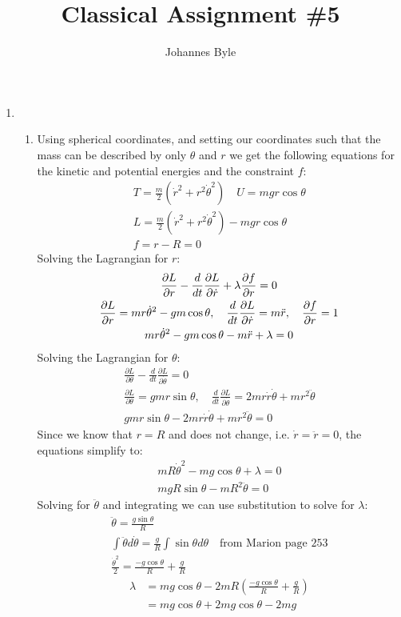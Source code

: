 \documentclass[12pt]{article}
\title{Classical Assignment \#5}
\author{Johannes Byle}
\newcommand{\p}[2]{\frac{\partial #1}{\partial #2}}
\newcommand{\der}[2]{\frac{d #1}{d #2}}
\newcommand{\Lag}[3]{
  \p{L}{#1}-\der{}{t}\p{L}{\dot{#1}}=0\\
  \p{L}{#1}=#2,\quad \der{}{t}\p{L}{\dot{#1}}=#3\\
  #2-#3=0
}
\newcommand{\Lagq}[4]{
  \p{L}{#1}-\der{}{t}\p{L}{\dot{#1}}+\lambda\p{f}{r}=0\\
  \p{L}{#1}=#2,\quad \der{}{t}\p{L}{\dot{#1}}=#3,\quad \p{f}{#1}=#4\\
  #2-#3\ifthenelse{#4=1}{+\lambda}{\ifthenelse{#4=0}{+0}{+\lambda#4}}=0
}
\begin{document}
  \maketitle
  \begin{enumerate}
    \item
    \begin{enumerate}
      \item Using spherical coordinates, and setting our coordinates such that the mass can be described by only $\theta$ and $r$ we get the following equations for the kinetic and potential energies and the constraint $f$:
      \begin{gather*}
        T=\frac{m}{2}\left(\dot{r}^2+r^2\dot{\theta}^2\right)\quad U=mgr\cos\theta\\
        L=\frac{m}{2}\left(\dot{r}^2+r^2\dot{\theta}^2\right)-mgr\cos\theta\\
        f=r-R=0
      \end{gather*}
      Solving the Lagrangian for $r$:
      \begin{gather*}
        \Lagq{r}{m r\dot{\theta}^2-g m \cos\theta}{m\ddot{r}}{1}
      \end{gather*}
      Solving the Lagrangian for $\theta$:
      \begin{gather*}
        \Lag{\theta}{gmr\sin\theta}{2mr\dot{r}\dot{\theta}+mr^2\ddot{\theta}}
      \end{gather*}
      Since we know that $r=R$ and does not change, i.e. $\dot{r}=\ddot{r}=0$, the equations simplify to:
      \begin{gather*}
        mR\dot{\theta}^2-mg\cos\theta+\lambda=0\\
        mgR\sin\theta-mR^2\ddot{\theta}=0
      \end{gather*}
      Solving for $\ddot{\theta}$ and integrating we can use substitution to solve for $\lambda$:
      \begin{gather*}
        \ddot{\theta}=\frac{g\sin\theta}{R}\\
        \int \ddot{\theta}d\dot{\theta}=\frac{g}{R}\int\sin\theta d\theta\quad \text{from Marion page 253}\\
        \frac{\dot{\theta}^2}{2}=\frac{-g\cos\theta}{R}+\frac{g}{R}
      \end{gather*}
      \begin{align*}
        \lambda&=mg\cos\theta-2mR\left( \frac{-g\cos\theta}{R}+\frac{g}{R} \right)\\
        &=mg\cos\theta+2mg\cos\theta-2mg\\

\end{align*}
\end{enumerate}
\end{enumerate}
\end{document}

